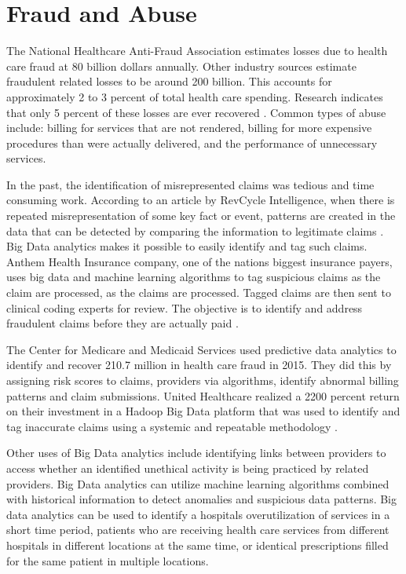 \documentclass[sigconf]{acmart}
\begin{document}
\section{Fraud and Abuse}
The National Healthcare Anti-Fraud Association estimates losses due to health care fraud at 80 billion dollars annually. Other industry sources estimate fraudulent related losses to be around 200 billion. This accounts for approximately 2 to 3 percent of total health care spending. Research indicates that only 5 percent of these losses are ever recovered \cite{www-google-datameer}.
Common types of abuse include: billing for services that are not rendered, billing for more expensive procedures than were actually delivered, and the performance of unnecessary services. 

In the past, the identification of misrepresented claims was tedious and time consuming work.  According to an article by RevCycle Intelligence, when there is repeated misrepresentation of some key fact or event, patterns are created in the data that can be detected by comparing the information to legitimate claims \cite{www-google-datameer}.  Big Data analytics makes it possible to easily identify and tag such claims. Anthem Health Insurance company, one of the nations biggest insurance payers, uses big data and machine learning algorithms to tag suspicious claims as the claim are processed,  as the claims are processed. Tagged claims are then sent to clinical coding experts for review. The objective is to identify and address fraudulent claims before they are actually paid \cite{www-google-datameer}.

The Center for Medicare and Medicaid Services used predictive data analytics to identify and recover 210.7 million in health care fraud in 2015. They did this by assigning risk scores to claims, providers via algorithms, identify abnormal billing patterns and claim submissions.  United Healthcare realized a 2200 percent return on their investment in a Hadoop Big Data platform that was used to identify and tag inaccurate claims using a systemic and repeatable methodology \cite{www-google-McDonald}.

Other uses of Big Data analytics include identifying links between providers to access whether an identified unethical activity is being practiced by related providers.  Big Data analytics can utilize machine learning algorithms combined with historical information to detect anomalies and suspicious data patterns. Big data analytics can be used to identify a hospitals overutilization of services in a short time period, patients who are receiving health care services from different hospitals in different locations at the same time, or identical prescriptions filled for the same patient in multiple locations. 
\end{document}
